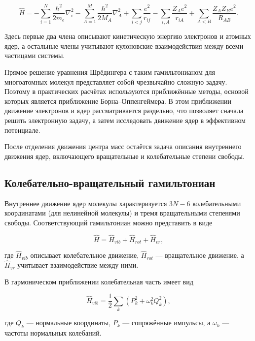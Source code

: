 \begin{equation}
\hat{H} =
-\sum_{i=1}^{N}\frac{\hbar^2}{2m_e}\nabla_i^2
-\sum_{A=1}^{M}\frac{\hbar^2}{2M_A}\nabla_A^2
+\sum_{i<j}\frac{e^2}{r_{ij}}
-\sum_{i,A}\frac{Z_A e^2}{r_{iA}}
+\sum_{A<B}\frac{Z_A Z_B e^2}{R_{AB}} .
\end{equation}

Здесь первые два члена описывают кинетическую энергию электронов
и атомных ядер, а остальные члены учитывают кулоновские взаимодействия
между всеми частицами системы.

Прямое решение уравнения Шрёдингера с таким гамильтонианом
для многоатомных молекул представляет собой чрезвычайно сложную задачу.
Поэтому в практических расчётах используются приближённые методы,
основой которых является приближение Борна–Оппенгеймера.
В этом приближении движение электронов и ядер рассматривается раздельно,
что позволяет сначала решить электронную задачу,
а затем исследовать движение ядер в эффективном потенциале.

После отделения движения центра масс остаётся задача описания
внутреннего движения ядер, включающего вращательные
и колебательные степени свободы.

\subsection{Колебательно-вращательный гамильтониан}

Внутреннее движение ядер молекулы характеризуется
$3N-6$ колебательными координатами
(для нелинейной молекулы) и тремя вращательными степенями свободы.
Соответствующий гамильтониан можно представить в виде

\begin{equation}
\hat{H} =
\hat{H}_{vib} +
\hat{H}_{rot} +
\hat{H}_{vr},
\end{equation}

где $\hat{H}_{vib}$ описывает колебательное движение,
$\hat{H}_{rot}$ — вращательное движение,
а $\hat{H}_{vr}$ учитывает взаимодействие между ними.

В гармоническом приближении колебательная часть имеет вид

\begin{equation}
\hat{H}_{vib} =
\frac{1}{2}\sum_k
\left(P_k^2 + \omega_k^2 Q_k^2 \right),
\end{equation}

где $Q_k$ — нормальные координаты,
$P_k$ — сопряжённые импульсы,
а $\omega_k$ — частоты нормальных колебаний.

